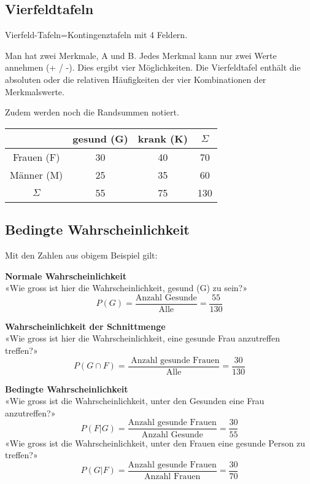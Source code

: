 \begin{multicols}{2}

\subsection*{Vierfeldtafeln}
Vierfeld-Tafeln=Kontingenztafeln mit 4 Feldern.

Man hat zwei Merkmale, A und B. Jedes Merkmal kann nur zwei Werte
annehmen (+ / -). Dies ergibt vier Möglichkeiten. Die Vierfeldtafel
enthält die absoluten oder die relativen Häufigkeiten der vier
Kombinationen der Merkmalswerte.

Zudem werden noch die Randsummen notiert.


\begin{tabular}{c|c|c|c}
           & gesund (G)& krank (K)& $\Sigma$ \\\hline
Frauen (F) &        30 &       40 &       70 \\\hline
Männer (M) &        25 &       35 &       60 \\\hline
$\Sigma$   &        55 &       75 &      130 \\\hline
 \end{tabular}



\subsection*{Bedingte Wahrscheinlichkeit}


Mit den Zahlen aus obigem Beispiel gilt:

\textbf{Normale Wahrscheinlichkeit}\\
«Wie gross ist hier die Wahrscheinlichkeit, gesund (G) zu sein?»
$$P(G) = \frac{\textrm{Anzahl Gesunde}}{\textrm{Alle}} =  \frac{55}{130}$$

\textbf{Wahrscheinlichkeit der Schnittmenge}\\
«Wie gross ist hier die Wahrscheinlichkeit, eine gesunde Frau anzutreffen treffen?»
$$P(G\cap F) = \frac{\textrm{\ Anzahl gesunde Frauen}}{\textrm{Alle}}= \frac{30}{130}$$

\textbf{Bedingte Wahrscheinlichkeit}\\
«Wie gross ist die Wahrscheinlichkeit, unter den Gesunden eine Frau anzutreffen?»
$$P(F | G) = \frac{\textrm{Anzahl gesunde Frauen}}{\textrm{Anzahl Gesunde}} =  \frac{30}{55}$$
«Wie gross ist die Wahrscheinlichkeit, unter den Frauen eine gesunde Person zu treffen?»
$$P(G | F) = \frac{\textrm{Anzahl gesunde Frauen}}{\textrm{Anzahl Frauen}}=  \frac{30}{70}$$

\end{multicols}


